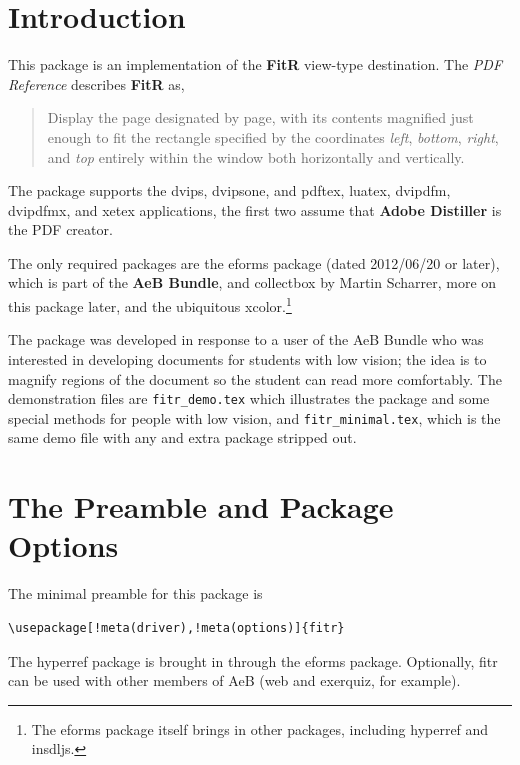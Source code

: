 \documentclass{article}
\def\fitrpkg{\textsf{f{i}tr}}
\begin{document}
\maketitle

\tableofcontents
{}

\section{Introduction}

This package is an implementation of the \textbf{FitR} view-type
destination. The \textsl{PDF Reference} describes \textbf{FitR} as,
\begin{quote}
    Display the page designated by page, with its contents
    magnified just enough to fit the rectangle specified by the
    coordinates \textsl{left}, \textsl{bottom}, \textsl{right},
    and \textsl{top} entirely within the
    window both horizontally and vertically.
\end{quote}
The package supports the \textsf{dvips}, \textsf{dvipsone}, and
\textsf{pdftex}, \textsf{luatex}, \textsf{dvipdfm}, \textsf{dvipdfmx}, and
\textsf{xetex} applications, the first two assume that \textbf{Adobe
Distiller} is the PDF creator.

The only required packages are the \textsf{eforms} package (dated
2012/06/20 or later), which is part of the \textbf{AeB Bundle}, and
\textsf{collectbox} by Martin Scharrer, more on this package later, and
the ubiquitous \textsf{xcolor}.\footnote{The \textsf{eforms} package
itself brings in other packages, including \textsf{hyperref} and
\textsf{insdljs}.}

The package was developed in response to a user of the AeB Bundle who was
interested in developing documents for students with low vision; the idea
is to magnify regions of the document so the student can read more
comfortably. The demonstration files are \texttt{fitr\_demo.tex} which
illustrates the package and some special methods for people with low
vision, and \texttt{fitr\_minimal.tex}, which is the same demo file with
any and extra package stripped out.

\section{The Preamble and Package Options}

The minimal preamble for this package is
\begin{Verbatim}[xleftmargin=20pt,commandchars=!()]
\usepackage[!meta(driver),!meta(options)]{fitr}
\end{Verbatim}
The \textsf{hyperref} package is brought in through the \textsf{eforms} package.
Optionally, {\fitrpkg} can be used with other members of AeB (\textsf{web} and
\textsf{exerquiz}, for example).
\end{document}
